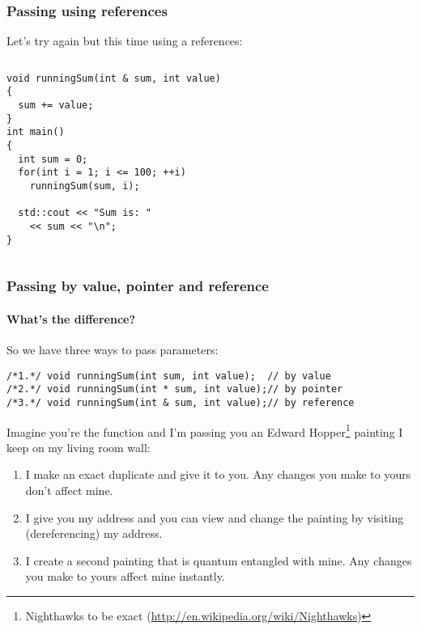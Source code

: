 \documentclass{beamer}
\begin{document}
\begin{frame}[fragile]
  \frametitle{Passing using references}
  
  Let's try again but this time using a references:
  \begin{columns}[t]
    \begin{column}[T]{0.6\textwidth}
	    \begin{lstlisting}[aboveskip=0pt]
void runningSum(int & sum, int value)
{
  sum += value;
}
int main()
{
  int sum = 0;
  for(int i = 1; i <= 100; ++i)
    runningSum(sum, i);
    
  std::cout << "Sum is: "
    << sum << "\n";
}
      \end{lstlisting}
    \end{column}
    \begin{column}[T]{0.4\textwidth}
    \end{column}
  \end{columns}
  
\end{frame}

\begin{frame}[fragile]
  \frametitle{Passing by value, pointer and reference}
  \framesubtitle{What's the difference?}
  
  So we have three ways to pass parameters:
  \begin{lstlisting}
/*1.*/ void runningSum(int sum, int value);  // by value
/*2.*/ void runningSum(int * sum, int value);// by pointer
/*3.*/ void runningSum(int & sum, int value);// by reference
  \end{lstlisting}
  Imagine you're the function and I'm passing you an Edward Hopper\footnote{Nighthawks to be exact (\url{http://en.wikipedia.org/wiki/Nighthawks})} painting I keep on my living room wall:
  \begin{enumerate}
  	\pause
    \item{I make an exact duplicate and give it to you.  Any changes you make to yours don't affect mine.}
    \pause
    \item{I give you my address and you can view and change the painting by visiting (dereferencing) my address.}
    \pause
  	\item{I create a second painting that is quantum entangled with mine.  Any changes you make to yours affect mine instantly.}
  \end{enumerate}

\end{frame}
\end{document}
